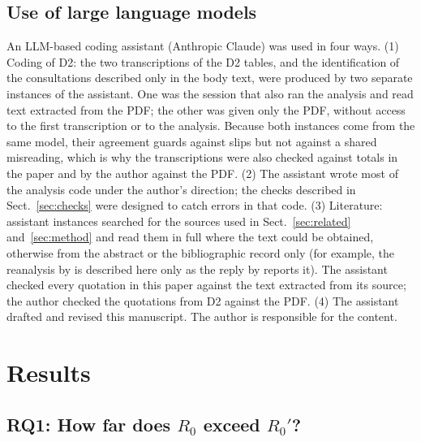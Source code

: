 \documentclass[pdflatex,sn-basic]{sn-jnl}
\newcommand{\Rz}{\ensuremath{R_0}}
\newcommand{\Rzp}{\ensuremath{R_0'}}
\begin{document}
\subsection{Use of large language models}\label{sec:llm}

An LLM-based coding assistant (Anthropic Claude) was used in four ways. (1) Coding of D2: the two transcriptions of the D2 tables, and the identification of the consultations described only in the body text, were produced by two separate instances of the assistant. One was the session that also ran the analysis and read text extracted from the PDF; the other was given only the PDF, without access to the first transcription or to the analysis. Because both instances come from the same model, their agreement guards against slips but not against a shared misreading, which is why the transcriptions were also checked against totals in the paper and by the author against the PDF. (2) The assistant wrote most of the analysis code under the author's direction; the checks described in Sect.~\ref{sec:checks} were designed to catch errors in that code. (3) Literature: assistant instances searched for the sources used in Sect.~\ref{sec:related} and~\ref{sec:method} and read them in full where the text could be obtained, otherwise from the abstract or the bibliographic record only (for example, the reanalysis by \citet{tantithamthavorn2016} is described here only as the reply by \citet{shepperd2018reply} reports it). The assistant checked every quotation in this paper against the text extracted from its source; the author checked the quotations from D2 against the PDF. (4) The assistant drafted and revised this manuscript. The author is responsible for the content.

\section{Results}\label{sec:results}

\subsection{RQ1: How far does \texorpdfstring{\Rz{}}{R0} exceed \texorpdfstring{\Rzp{}}{R0'}?}
\end{document}
